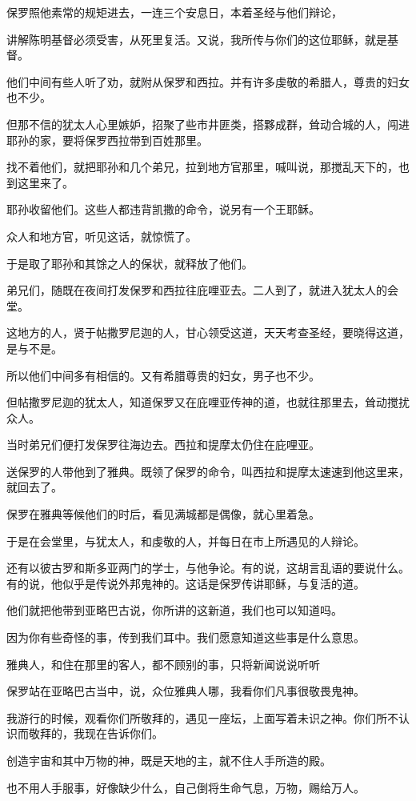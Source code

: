\documentclass[12pt,oneside]{book}
\begin{document}
保罗照他素常的规矩进去，一连三个安息日，本着圣经与他们辩论，

讲解陈明基督必须受害，从死里复活。又说，我所传与你们的这位耶稣，就是基督。

他们中间有些人听了劝，就附从保罗和西拉。并有许多虔敬的希腊人，尊贵的妇女也不少。

但那不信的犹太人心里嫉妒，招聚了些市井匪类，搭夥成群，耸动合城的人，闯进耶孙的家，要将保罗西拉带到百姓那里。

找不着他们，就把耶孙和几个弟兄，拉到地方官那里，喊叫说，那搅乱天下的，也到这里来了。

耶孙收留他们。这些人都违背凯撒的命令，说另有一个王耶稣。

众人和地方官，听见这话，就惊慌了。

于是取了耶孙和其馀之人的保状，就释放了他们。

弟兄们，随既在夜间打发保罗和西拉往庇哩亚去。二人到了，就进入犹太人的会堂。

这地方的人，贤于帖撒罗尼迦的人，甘心领受这道，天天考查圣经，要晓得这道，是与不是。

所以他们中间多有相信的。又有希腊尊贵的妇女，男子也不少。

但帖撒罗尼迦的犹太人，知道保罗又在庇哩亚传神的道，也就往那里去，耸动搅扰众人。

当时弟兄们便打发保罗往海边去。西拉和提摩太仍住在庇哩亚。

送保罗的人带他到了雅典。既领了保罗的命令，叫西拉和提摩太速速到他这里来，就回去了。

保罗在雅典等候他们的时后，看见满城都是偶像，就心里着急。

于是在会堂里，与犹太人，和虔敬的人，并每日在市上所遇见的人辩论。

还有以彼古罗和斯多亚两门的学士，与他争论。有的说，这胡言乱语的要说什么。有的说，他似乎是传说外邦鬼神的。这话是保罗传讲耶稣，与复活的道。

他们就把他带到亚略巴古说，你所讲的这新道，我们也可以知道吗。

因为你有些奇怪的事，传到我们耳中。我们愿意知道这些事是什么意思。

雅典人，和住在那里的客人，都不顾别的事，只将新闻说说听听

保罗站在亚略巴古当中，说，众位雅典人哪，我看你们凡事很敬畏鬼神。

我游行的时候，观看你们所敬拜的，遇见一座坛，上面写着未识之神。你们所不认识而敬拜的，我现在告诉你们。

创造宇宙和其中万物的神，既是天地的主，就不住人手所造的殿。

也不用人手服事，好像缺少什么，自己倒将生命气息，万物，赐给万人。
\end{document}
